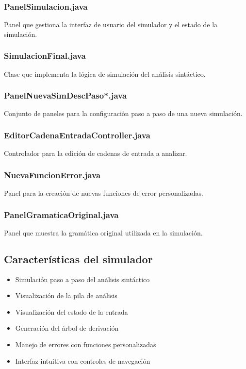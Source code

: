 \subsubsection{PanelSimulacion.java}

Panel que gestiona la interfaz de usuario del simulador y el estado de la simulación.

\subsubsection{SimulacionFinal.java}

Clase que implementa la lógica de simulación del análisis sintáctico.

\subsubsection{PanelNuevaSimDescPaso*.java}

Conjunto de paneles para la configuración paso a paso de una nueva simulación.

\subsubsection{EditorCadenaEntradaController.java}

Controlador para la edición de cadenas de entrada a analizar.

\subsubsection{NuevaFuncionError.java}

Panel para la creación de nuevas funciones de error personalizadas.

\subsubsection{PanelGramaticaOriginal.java}

Panel que muestra la gramática original utilizada en la simulación.

\subsection{Características del simulador}

\begin{itemize}
    \item Simulación paso a paso del análisis sintáctico
    \item Visualización de la pila de análisis
    \item Visualización del estado de la entrada
    \item Generación del árbol de derivación
    \item Manejo de errores con funciones personalizadas
    \item Interfaz intuitiva con controles de navegación
\end{itemize}

